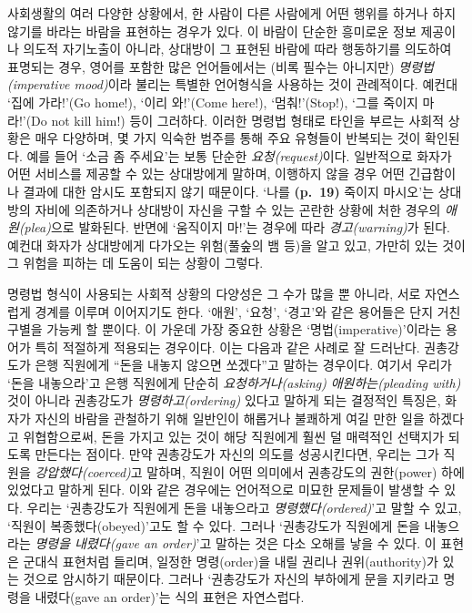\documentclass[12pt, oneside]{book}  %
\begin{document}
사회생활의 여러 다양한 상황에서, 한 사람이 다른 사람에게 어떤 행위를
하거나 하지 않기를 바라는 바람을 표현하는 경우가 있다. 이 바람이 단순한
흥미로운 정보 제공이나 의도적 자기노출이 아니라, 상대방이 그 표현된
바람에 따라 행동하기를 의도하여 표명되는 경우, 영어를 포함한 많은
언어들에서는 (비록 필수는 아니지만) \emph{명령법(imperative mood)}이라
불리는 특별한 언어형식을 사용하는 것이 관례적이다. 예컨대 `집에
가라!'(Go home!), `이리 와!'(Come here!), `멈춰!'(Stop!), `그를 죽이지
마라!'(Do not kill him!) 등이 그러하다. 이러한 명령법 형태로 타인을
부르는 사회적 상황은 매우 다양하며, 몇 가지 익숙한 범주를 통해 주요
유형들이 반복되는 것이 확인된다. 예를 들어 `소금 좀 주세요'는 보통
단순한 \emph{요청(request)}이다. 일반적으로 화자가 어떤 서비스를 제공할
수 있는 상대방에게 말하며, 이행하지 않을 경우 어떤 긴급함이나 결과에
대한 암시도 포함되지 않기 때문이다. `나를 \textbf{(p.~19)} 죽이지
마시오'는 상대방의 자비에 의존하거나 상대방이 자신을 구할 수 있는 곤란한
상황에 처한 경우의 \emph{애원(plea)}으로 발화된다. 반면에 `움직이지
마!'는 경우에 따라 \emph{경고(warning)}가 된다. 예컨대 화자가 상대방에게
다가오는 위험(풀숲의 뱀 등)을 알고 있고, 가만히 있는 것이 그 위험을
피하는 데 도움이 되는 상황이 그렇다.

명령법 형식이 사용되는 사회적 상황의 다양성은 그 수가 많을 뿐 아니라,
서로 자연스럽게 경계를 이루며 이어지기도 한다. `애원', `요청', `경고'와
같은 용어들은 단지 거친 구별을 가능케 할 뿐이다. 이 가운데 가장 중요한
상황은 `명법(imperative)'이라는 용어가 특히 적절하게 적용되는 경우이다.
이는 다음과 같은 사례로 잘 드러난다. 권총강도가 은행 직원에게 ``돈을
내놓지 않으면 쏘겠다''고 말하는 경우이다. 여기서 우리가 `돈을
내놓으라'고 은행 직원에게 단순히 \emph{요청하거나(asking)}
\emph{애원하는(pleading with)} 것이 아니라 권총강도가
\emph{명령하고(ordering)} 있다고 말하게 되는 결정적인 특징은, 화자가
자신의 바람을 관철하기 위해 일반인이 해롭거나 불쾌하게 여길 만한 일을
하겠다고 위협함으로써, 돈을 가지고 있는 것이 해당 직원에게 훨씬 덜
매력적인 선택지가 되도록 만든다는 점이다. 만약 권총강도가 자신의 의도를
성공시킨다면, 우리는 그가 직원을 \emph{강압했다(coerced)}고 말하며,
직원이 어떤 의미에서 권총강도의 권한(power) 하에 있었다고 말하게 된다. 이와
같은 경우에는 언어적으로 미묘한 문제들이 발생할 수 있다. 우리는 `권총강도가
직원에게 돈을 내놓으라고 \emph{명령했다(ordered)}'고 말할 수 있고,
`직원이 복종했다(obeyed)'고도 할 수 있다. 그러나 `권총강도가 직원에게 돈을
내놓으라는 \emph{명령을 내렸다(gave an order)}'고 말하는 것은 다소
오해를 낳을 수 있다. 이 표현은 군대식 표현처럼 들리며, 일정한
명령(order)을 내릴 권리나 권위(authority)가 있는 것으로 암시하기
때문이다. 그러나 `권총강도가 자신의 부하에게 문을 지키라고 명령을
내렸다(gave an order)'는 식의 표현은 자연스럽다.
\end{document}
